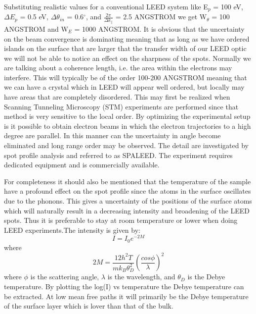 Substituting realistic values for a conventional LEED system like E$_{p}$ = 100 eV, $\Delta E_{p}$ = 0.5 eV, $\Delta\theta_{in}$ = 0.6$^{\circ}$, and $\frac{2\pi}{\Delta k_{\parallel}}$ = 2.5 ANGSTROM we get W$_{\theta}$ = 100 ANGSTROM and W$_{E}$ =  1000 ANGSTROM. It is obvious that the uncertainty on the beam convergence is dominating meaning that as long as we have ordered islands on the surface that are larger that the transfer width of our LEED optic we will not be able to notice an effect on the sharpness of the spots. Normally we are talking about a coherence length, i.e. the area within the electrons may interfere. This will typically be of the order 100-200 ANGSTROM meaning that we can have a crystal which in LEED will appear well ordered, but locally may have areas that are completely disordered. This may first be realized when Scanning Tunneling Microscopy (STM) experiments are performed since that method is very sensitive to the local order. By optimizing the experimental setup is it possible to obtain electron beams in which the electron trajectories to a high degree are parallel. In this manner can the uncertainty in angle become eliminated and long range order may be observed. The detail are investigated by spot profile analysis and referred to as SPALEED. The experiment requires dedicated equipment and is commercially available.

For completeness it should also be mentioned that the temperature of the sample have a profound effect on the spot profile since the atoms in the surface oscillates due to the phonons. This gives a uncertainty of the positions of the surface atoms which will naturally result in a decreasing intensity and broadening of the LEED spots. Thus it is preferable to stay at room temperature or lower when doing LEED experiments.The intensity is given by: 
\begin{equation}
I=I_{0}e^{-2M}
\end{equation}
where
 \begin{equation}
2M = \frac{12h^{2}T}{mk_{B}\theta_{D}^{2}}(\frac{cos{\phi}}{\lambda})^2
\end{equation}
where $\phi$ is the scattering angle, $\lambda$ is the wavelength, and $\theta_{D}$ is the Debye temperature. By plotting the log(I) vs temperature the Debye temperature can be extracted. At low mean free paths it will primarily be the Debye temperature of the surface layer which is lover than that of the bulk.

